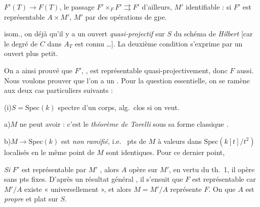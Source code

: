 \documentclass[11pt,a4paper]{article}
\begin{document}
 $F'(T) \to F(T)$, le passage \ill{} \ill{}
 $F' \times_{F} F' \rightrightarrows F'$ \ill{}
\ill{} d'ailleurs, \ill{} $M'$ identifiable : \struck{\ill{}} si $F'$ est
représentable \ill{} $A \times M'$, \ill{} \ill{} $M'$ par des opérations de
gpe.



isom., on  déjà qu'il y a \struck{\ill{}} un ouvert
\emph{quasi-projectif} sur $S$ du schéma de \emph{Hilbert} [car le
\struck{\ill{}} degré de $C$ dans $A_{T}$ est connu \ldots]. 
La deuxième condition  s'exprime par un ouvert plus
petit.

On a ainsi prouvé que $F'$, , est représentable
quasi-projectivement, donc $F$ aussi. Nous voulons prouver que l'on a un
 . Pour la question
essentielle, on se ramène aux deux cas particuliers suivants :

(i)\quad $S = \mathrm{Spec}(k)$ spectre d'un corps, alg.\ clos si on veut.

a)\quad $M$ ne peut avoir \ill{} \ill{}  \ill{}
 \ill{} \ill{} \ill{} : c'est le \emph{théorème de Torelli} sous sa
forme classique .

b)\quad $M \to \mathrm{Spec}(k)$ est \emph{non ramifié}, i.e.\ 
 pts de $M$ à valeurs dans $\mathrm{Spec}(k[t]/t^{2})$ localisés en
le même point de $M$ sont identiques. Pour ce dernier point,



\emph{Si} $F'$ est représentable par $M'$ , alors $A$ opère sur $M'$, en vertu du th.\ 1, il
opère sans pts fixes. D'après un résultat général , il s'ensuit que $F$ est représentable car $M'/A$ existe
« universellement », et alors $M = M'/A$ représente $F$. On \ill{} \ill{}
\ill{} \ill{} \ill{} que $A$ est \emph{propre} et plat sur $S$.
\end{document}
